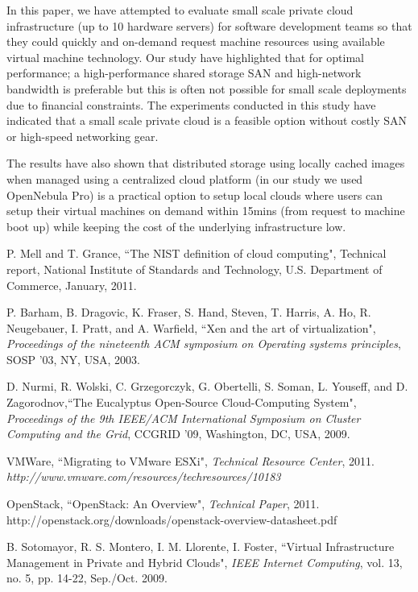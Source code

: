 \documentclass[acus]{JAC2003}
\begin{document}
In this paper, we have attempted to evaluate small scale private cloud infrastructure (up to 10 hardware servers) for software development teams so that they could quickly and on-demand request machine resources using available virtual machine technology. Our study have  highlighted that for optimal performance; a high-performance shared storage SAN and high-network bandwidth is preferable but this is often not possible for small scale deployments due to financial constraints. The experiments conducted in this study have indicated that a small scale private cloud is a feasible option without costly SAN or high-speed networking gear. 

The results have also shown that distributed storage using locally cached images when managed using a centralized cloud platform (in our study we used OpenNebula Pro) is a practical option to setup local clouds where users can setup their virtual machines on demand within 15mins (from request to machine boot up) while keeping the cost of the underlying infrastructure low.
 
 
\begin{thebibliography}{9}   

P. Mell and T. Grance, ``The NIST definition of cloud computing", Technical report, National Institute of Standards and Technology, U.S. Department of Commerce, January, 2011.

P. Barham, B. Dragovic, K. Fraser, S. Hand, Steven, T. Harris, A. Ho, R. Neugebauer, I. Pratt, and A. Warfield, ``Xen and the art of virtualization", \textit{Proceedings of the nineteenth ACM symposium on Operating systems principles}, SOSP '03, NY, USA, 2003.

D. Nurmi, R. Wolski, C. Grzegorczyk, G. Obertelli, S. Soman, L. Youseff, and D. Zagorodnov,``The Eucalyptus Open-Source Cloud-Computing System", \textit{Proceedings of the 9th IEEE/ACM International Symposium on Cluster Computing and the Grid}, CCGRID '09, Washington, DC, USA, 2009.

VMWare, ``Migrating to VMware ESXi", \textit{Technical Resource Center}, 2011. \textit{http://www.vmware.com/resources/techresources/10183}

OpenStack, ``OpenStack: An Overview", \textit{Technical Paper}, 2011.
{http://openstack.org/downloads/openstack-overview-datasheet.pdf}

B. Sotomayor, R. S. Montero, I. M. Llorente, I. Foster, ``Virtual Infrastructure Management in Private and Hybrid Clouds", \textit{IEEE Internet Computing}, vol. 13, no. 5, pp. 14-22, Sep./Oct. 2009.

\end{thebibliography}
\end{document}
